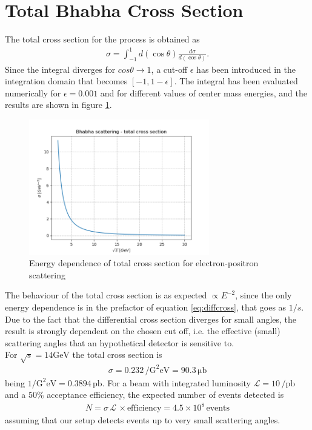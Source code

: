 \documentclass[10pt,a4paper]{article}
\begin{document}
\section{Total Bhabha Cross Section}
The total cross section for the process is obtained as
\begin{align*}
\sigma = \int_{-1}^1 d(\cos\theta) \frac{d\sigma}{d(\cos\theta)}.
\end{align*}
Since the integral diverges for $cos\theta \rightarrow 1$, a cut-off $\epsilon$ has been introduced in the integration domain that becomes $[-1,1-\epsilon]$. The integral has been evaluated numerically for $\epsilon=0.001$ and for different values of center mass energies, and the results are shown in figure \ref{fig:totalcrossection}.

\begin{figure}[!ht]
\centering
\includegraphics[width=0.7\textwidth]{figures/totalCS.png}
\caption{Energy dependence of total cross section for electron-positron scattering}
\label{fig:totalcrossection}
\end{figure}

The behaviour of the total cross section is as expected $\propto E^{-2}$, since the only energy dependence is in the prefactor of equation \ref{eq:diffcross}, that goes as $1/s$.\\
Due to the fact that the differential cross section diverges for small angles, the result is strongly dependent on the chosen cut off, i.e. the effective (small) scattering angles that an hypothetical detector is sensitive to.\\

For $\sqrt{s}=14\si{\giga\electronvolt}$ the total cross section is
\begin{align*}
\sigma  = 0.232\,\si{\per\square\giga\electronvolt} = 90.3\,\si{\micro\barn}
\end{align*}
being $1\si{\per\square\giga\electronvolt}=0.3894\,\si{\pico\barn}$.
For a beam with integrated luminosity $\mathcal{L}=10\,\si{\per\pico\barn}$ and a $50\si{\percent}$ acceptance efficiency, the expected number of events detected is
\begin{align*}
N = \sigma\,\mathcal{L}\,\times \text{efficiency} = 4.5\times10^8\,\text{events}
\end{align*}
assuming that our setup detects events up to very small scattering angles.\\
\end{document}
